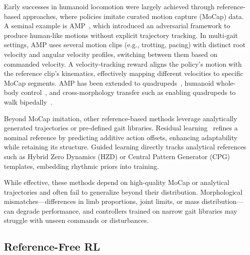 \documentclass[letterpaper, 10 pt, conference]{ieeeconf}
\begin{document}
Early successes in humanoid locomotion were largely achieved through reference-based approaches, where policies imitate curated motion capture (MoCap) data.
A seminal example is AMP~\cite{peng2021amp}, which introduced an adversarial framework to produce human-like motions without explicit trajectory tracking. In multi-gait settings, AMP uses several motion clips (e.g., trotting, pacing) with distinct root velocity and angular velocity profiles, switching between them based on commanded velocity. A velocity-tracking reward aligns the policy’s motion with the reference clip’s kinematics, effectively mapping different velocities to specific MoCap segments.
AMP has been extended to quadrupeds~\cite{escontrela2022adversarial}, humanoid whole-body control~\cite{ampforhumanoid}, and cross-morphology transfer such as enabling quadrupeds to walk bipedally~\cite{peng2024learning}.

Beyond MoCap imitation, other reference-based methods leverage analytically generated trajectories or pre-defined gait libraries. Residual learning~\cite{2020_Xie_firstsim2real_,2021_siekmann_sim2real_nonreference_perodicreward_DRL_e2e_LSTM_PPO_cassie} refines a nominal reference by predicting additive action offsets, enhancing adaptability while retaining its structure. Guided learning directly tracks analytical references such as Hybrid Zero Dynamics (HZD)\cite{2021_UCB_hybridrobotics_sim2real_referencebased_HZD_gaitlibrary_e2epolicy_drl_Cassie_lowpassfilter} or Central Pattern Generator (CPG) templates\cite{hwangbo2019learning}, embedding rhythmic priors into training.

While effective, these methods depend on high-quality MoCap or analytical trajectories and often fail to generalize beyond their distribution. Morphological mismatches—differences in limb proportions, joint limits, or mass distribution—can degrade performance, and controllers trained on narrow gait libraries may struggle with unseen commands or disturbances.

\subsection{Reference-Free RL}
\end{document}

